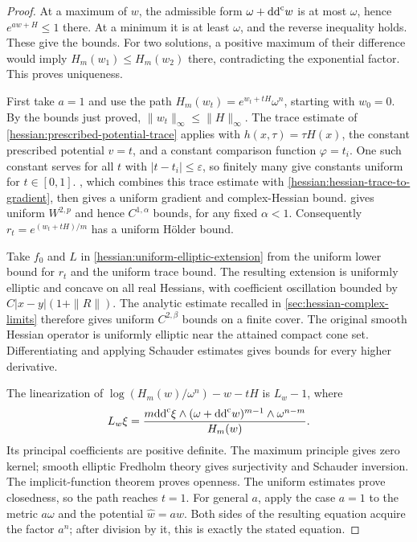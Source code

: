 \begin{proof}
At a maximum of $w$, the admissible form $\omega+\mathrm{dd}^{\mathrm{c}} w$ is at most
$\omega$, hence $e^{aw+H}\leq1$ there. At a minimum it is at least
$\omega$, and the reverse inequality holds. These give the bounds.
For two solutions, a positive maximum of their difference would imply
$H_m(w_1)\leq H_m(w_2)$ there, contradicting the exponential factor.
This proves uniqueness.

First take $a=1$ and use the path
$H_m(w_t)=e^{w_t+tH}\omega^n$, starting with $w_0=0$.
By the bounds just proved, $\|w_t\|_\infty\leq\|H\|_\infty$.
The trace estimate of \cref{hessian:prescribed-potential-trace} applies with
$h(x,\tau)=\tau H(x)$, the constant prescribed potential $v=t$, and a
constant comparison function $\varphi=t_i$. One such constant serves for
all $t$ with $|t-t_i|\leq\varepsilon$, so finitely many give constants
uniform for $t\in[0,1]$.
, which combines this
trace estimate with \cref{hessian:hessian-trace-to-gradient}, then gives a
uniform gradient and complex-Hessian bound.  gives uniform $W^{2,p}$ and hence $C^{1,\alpha}$ bounds, for any
fixed $\alpha<1$. Consequently
$r_t=e^{(w_t+tH)/m}$ has a uniform H\"older bound.

Take $f_0$ and $L$ in \cref{hessian:uniform-elliptic-extension} from
the uniform lower bound for $r_t$ and the uniform trace bound. The
resulting extension is uniformly elliptic and concave on all real
Hessians, with coefficient oscillation bounded by
$C|x-y|(1+\|R\|)$. The analytic estimate recalled in \cref{sec:hessian-complex-limits} therefore gives uniform $C^{2,\beta}$
bounds on a finite cover. The original smooth Hessian operator is
uniformly elliptic near the attained compact cone set. Differentiating
and applying Schauder estimates gives bounds for every higher derivative.

The linearization of
$\log(H_m(w)/\omega^n)-w-tH$ is $L_w-1$, where
\[
 L_w\xi=\frac{m\mathrm{dd}^{\mathrm{c}}\xi\wedge(\omega+\mathrm{dd}^{\mathrm{c}} w)^{m-1}
                                  \wedge\omega^{n-m}}{H_m(w)}.
\]
Its principal coefficients are positive definite. The maximum principle gives zero kernel;
smooth elliptic Fredholm theory gives surjectivity and Schauder inversion.
The implicit-function theorem proves openness. The uniform estimates
prove closedness, so the path reaches $t=1$.
For general $a$, apply the case $a=1$ to the metric $a\omega$ and the
potential $\widehat w=aw$. Both sides of the resulting equation acquire
the factor $a^n$; after division by it, this is exactly the stated
equation.
\end{proof}

